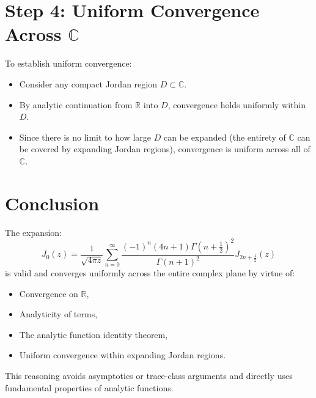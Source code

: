 \documentclass{article}
\begin{document}
\section*{Step 4: Uniform Convergence Across $\mathbb{C}$}

To establish uniform convergence:
\begin{itemize}
    \item Consider any compact Jordan region $D \subset \mathbb{C}$.  
    \item By analytic continuation from $\mathbb{R}$ into $D$, convergence holds uniformly within $D$.  
    \item Since there is no limit to how large $D$ can be expanded (the entirety of $\mathbb{C}$ can be covered by expanding Jordan regions), convergence is uniform across all of $\mathbb{C}$.
\end{itemize}

\section*{Conclusion}

The expansion:
$$J_0(z) = \frac{1}{\sqrt{4\pi z}} \sum_{n=0}^\infty \frac{(-1)^n (4n + 1) \Gamma(n + \frac{1}{2})^2}{\Gamma(n + 1)^2} J_{2n + \frac{1}{2}}(z)$$
is valid and converges uniformly across the entire complex plane by virtue of:
\begin{itemize}
    \item Convergence on $\mathbb{R}$,
    \item Analyticity of terms,
    \item The analytic function identity theorem,
    \item Uniform convergence within expanding Jordan regions.
\end{itemize}

This reasoning avoids asymptotics or trace-class arguments and directly uses fundamental properties of analytic functions.
\end{document}
